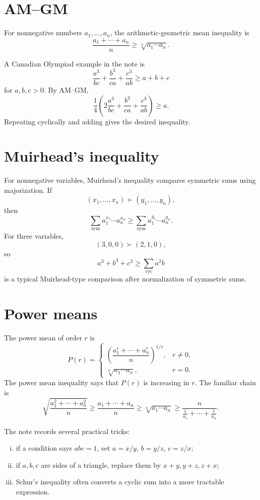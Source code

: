 \section{AM--GM}

For nonnegative numbers \(a_1,\ldots,a_n\), the arithmetic-geometric mean inequality is
\[
  \frac{a_1+\cdots+a_n}{n}\ge \sqrt[n]{a_1\cdots a_n}.
\]

A Canadian Olympiad example in the note is
\[
  \frac{a^3}{bc}+\frac{b^3}{ca}+\frac{c^3}{ab}\ge a+b+c
\]
for \(a,b,c>0\).  By AM--GM,
\[
  \frac{1}{4}\left(2\frac{a^3}{bc}+\frac{b^3}{ca}+\frac{c^3}{ab}\right)
  \ge a.
\]
Repeating cyclically and adding gives the desired inequality.

\section{Muirhead's inequality}

For nonnegative variables, Muirhead's inequality compares symmetric sums using majorization.  If
\[
  (x_1,\ldots,x_n)\succ (y_1,\ldots,y_n),
\]
then
\[
  \sum_{\mathrm{sym}}a_1^{x_1}\cdots a_n^{x_n}
  \ge
  \sum_{\mathrm{sym}}a_1^{y_1}\cdots a_n^{y_n}.
\]
For three variables,
\[
  (3,0,0)\succ(2,1,0),
\]
so
\[
  a^3+b^3+c^3\ge \sum_{\mathrm{cyc}}a^2b
\]
is a typical Muirhead-type comparison after normalization of symmetric sums.

\section{Power means}

The power mean of order \(r\) is
\[
  P(r)=
  \begin{cases}
  \left(\dfrac{a_1^r+\cdots+a_n^r}{n}\right)^{1/r},&r\neq0,\\
  \sqrt[n]{a_1\cdots a_n},&r=0.
  \end{cases}
\]
The power mean inequality says that \(P(r)\) is increasing in \(r\).  The familiar chain is
\[
  \sqrt{\frac{a_1^2+\cdots+a_n^2}{n}}
  \ge
  \frac{a_1+\cdots+a_n}{n}
  \ge
  \sqrt[n]{a_1\cdots a_n}
  \ge
  \frac{n}{\frac1{a_1}+\cdots+\frac1{a_n}}.
\]

The note records several practical tricks:
\begin{enumerate}[(i)]
  \item if a condition says \(abc=1\), set \(a=x/y\), \(b=y/z\), \(c=z/x\);
  \item if \(a,b,c\) are sides of a triangle, replace them by \(x+y,y+z,z+x\);
  \item Schur's inequality often converts a cyclic sum into a more tractable expression.
\end{enumerate}

